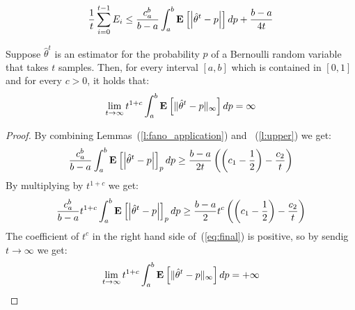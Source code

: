 \begin{lemma}\label{l:upper}
\[ \frac{1}{t} \sum_{i=0}^{t-1} E_i \leq \frac{c_a^b}{b-a} \int_a^b \Exp{\lp|\hat{\theta}^t-p\rp|} dp + \frac{b-a}{4t}\]

\end{lemma}

\begin{theorem}\label{t:lower_bound}
Suppose $\hat{\theta}^t$ is an estimator for the probability $p$ of a Bernoulli random variable that takes $t$ samples. Then, for every interval $[a,b]$ which is contained in $[0,1]$ and for every $c>0$, it holds that:
$$ \lim_{t\to\infty} t^{1+c}\int_{a}^b \Exp{\norm{\infty}{\hat{\theta}^t-p}}dp = \infty$$
\end{theorem}
\begin{proof}
By combining Lemmas~(\ref{l:fano_application}) and ~(\ref{l:upper}) we get:
\[\frac{c_a^b}{b-a} \int_a^b \Exp{\lp|\hat{\theta}^t-p\rp|}_p dp \geq \frac{b-a}{2t}\lp(\lp(c_1 - \frac{1}{2}\rp)- \frac{c_2}{t}\rp)\]
By multiplying by $t^{1+c}$ we get:
\begin{equation}\label{eq:final}
\frac{c_a^b}{b-a}t^{1+c} \int_a^b \Exp{\lp|\hat{\theta}^t-p\rp|}_p dp \geq \frac{b-a}{2}t^c\lp(\lp(c_1 - \frac{1}{2}\rp)- \frac{c_2}{t}\rp)
\end{equation}
The coefficient of $t^c$ in the right hand side of~(\ref{eq:final}) is positive, so by sendig $t \to \infty$ we get:
\[ \lim_{t\to\infty} t^{1+c}\int_{a}^b \Exp{\norm{\infty}{\hat{\theta}^t-p}}dp = +\infty\]
\end{proof}
